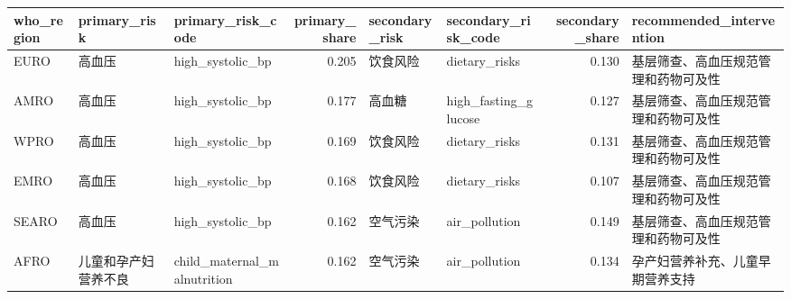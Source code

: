 \begin{tabular}{lllrllrl}
\toprule
who_region & primary_risk & primary_risk_code & primary_share & secondary_risk & secondary_risk_code & secondary_share & recommended_intervention \\
\midrule
EURO & 高血压 & high_systolic_bp & 0.205 & 饮食风险 & dietary_risks & 0.130 & 基层筛查、高血压规范管理和药物可及性 \\
AMRO & 高血压 & high_systolic_bp & 0.177 & 高血糖 & high_fasting_glucose & 0.127 & 基层筛查、高血压规范管理和药物可及性 \\
WPRO & 高血压 & high_systolic_bp & 0.169 & 饮食风险 & dietary_risks & 0.131 & 基层筛查、高血压规范管理和药物可及性 \\
EMRO & 高血压 & high_systolic_bp & 0.168 & 饮食风险 & dietary_risks & 0.107 & 基层筛查、高血压规范管理和药物可及性 \\
SEARO & 高血压 & high_systolic_bp & 0.162 & 空气污染 & air_pollution & 0.149 & 基层筛查、高血压规范管理和药物可及性 \\
AFRO & 儿童和孕产妇营养不良 & child_maternal_malnutrition & 0.162 & 空气污染 & air_pollution & 0.134 & 孕产妇营养补充、儿童早期营养支持 \\
\bottomrule
\end{tabular}
